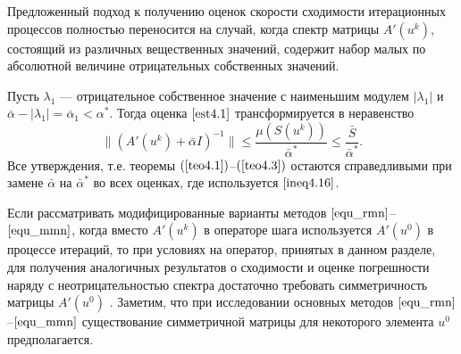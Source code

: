 {\remark Предложенный подход к получению оценок скорости сходимости итерационных процессов полностью переносится на случай, когда спектр матрицы $A'(u^k)$, состоящий из различных вещественных значений, содержит набор малых по абсолютной величине отрицательных собственных значений.} 

Пусть $\lambda _1$ --- отрицательное собственное значение с наименьшим модулем $|\lambda_1|$ и $\bar\alpha -|\lambda _1|=\bar\alpha _1<\alpha^*$. Тогда оценка $\eqref{est4.1}$ трансформируется в неравенство
\begin{equation}\label{ineq4.16}
\|(A'(u^k)+\bar\alpha I)^{-1}\|\le\frac{\mu(S(u^k))}{\bar\alpha^*}\le\frac{\bar S}{\bar\alpha^*}.
\end{equation}
Все утверждения, т.е. теоремы $(\ref{teo4.1})$--$(\ref{teo4.3})$ остаются справедливыми при замене $\bar\alpha$ на $\bar\alpha^*$ во всех оценках, где используется $\eqref{ineq4.16}$.

{\remark Если рассматривать модифицированные варианты методов $\eqref{equ_rmn}$--$\eqref{equ_mmn}$, когда вместо $A'(u^k)$ в операторе шага используется $A'(u^0)$ в процессе итераций, то при условиях на оператор, принятых в данном разделе, для получения аналогичных результатов о сходимости и оценке погрешности наряду с неотрицательностью спектра достаточно требовать симметричность матрицы $A'(u^0)$ \cite{VasAkiMin2013, Vasin2014, Vasin2016}. Заметим, что при исследовании основных методов $\eqref{equ_rmn}$--$\eqref{equ_mmn}$ существование симметричной матрицы для некоторого элемента $u^0$ предполагается.}

\newpage

